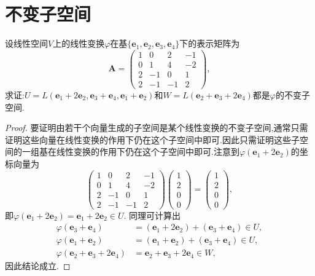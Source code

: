 \documentclass[../../main.tex]{subfiles}
\begin{document}
\section{不变子空间}

\begin{example}
设线性空间\(V\)上的线性变换\(\varphi\)在基\(\{\boldsymbol{e}_1,\boldsymbol{e}_2,\boldsymbol{e}_3,\boldsymbol{e}_4\}\)下的表示矩阵为
\[
\boldsymbol{A}=\begin{pmatrix}
1&0&2&-1\\
0&1&4&-2\\
2&-1&0&1\\
2&-1&-1&2
\end{pmatrix},
\]
求证:\(U = L(\boldsymbol{e}_1 + 2\boldsymbol{e}_2,\boldsymbol{e}_3 + \boldsymbol{e}_4,\boldsymbol{e}_1 + \boldsymbol{e}_2)\)和\(W = L(\boldsymbol{e}_2 + \boldsymbol{e}_3 + 2\boldsymbol{e}_4)\)都是\(\varphi\)的不变子空间.
\end{example}
\begin{proof}
要证明由若干个向量生成的子空间是某个线性变换的不变子空间,通常只需证明这些向量在线性变换的作用下仍在这个子空间中即可.因此只需证明这些子空间的一组基在线性变换的作用下仍在这个子空间中即可.注意到\(\varphi(\boldsymbol{e}_1 + 2\boldsymbol{e}_2)\)的坐标向量为
\[
\begin{pmatrix}
1&0&2&-1\\
0&1&4&-2\\
2&-1&0&1\\
2&-1&-1&2
\end{pmatrix}
\begin{pmatrix}
1\\
2\\
0\\
0
\end{pmatrix}=
\begin{pmatrix}
1\\
2\\
0\\
0
\end{pmatrix},
\]
即\(\varphi(\boldsymbol{e}_1 + 2\boldsymbol{e}_2)=\boldsymbol{e}_1 + 2\boldsymbol{e}_2\in U\). 同理可计算出
\begin{align*}
\varphi(\boldsymbol{e}_3 + \boldsymbol{e}_4)&=(\boldsymbol{e}_1 + 2\boldsymbol{e}_2)+(\boldsymbol{e}_3 + \boldsymbol{e}_4)\in U,\\
\varphi(\boldsymbol{e}_1 + \boldsymbol{e}_2)&=(\boldsymbol{e}_1 + \boldsymbol{e}_2)+(\boldsymbol{e}_3 + \boldsymbol{e}_4)\in U,\\
\varphi(\boldsymbol{e}_2 + \boldsymbol{e}_3 + 2\boldsymbol{e}_4)&=\boldsymbol{e}_2 + \boldsymbol{e}_3 + 2\boldsymbol{e}_4\in W,
\end{align*}
因此结论成立. 
\end{proof}
\end{document}
